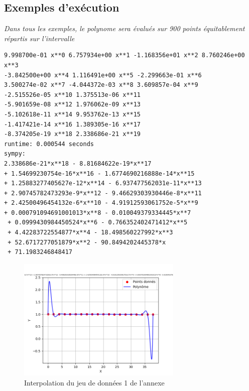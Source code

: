 \subsection{Exemples d'exécution}
\textit{Dans tous les exemples, le polynome sera évalués sur 900 points équitablement répartis sur l'intervalle}
\begin{lstlisting}[caption=res41.err, basicstyle=\fontsize{8}{10}\selectfont]
9.998700e-01 x**0 6.757934e+00 x**1 -1.168356e+01 x**2 8.760246e+00 x**3
-3.842500e+00 x**4 1.116491e+00 x**5 -2.299663e-01 x**6 
3.500274e-02 x**7 -4.044372e-03 x**8 3.609857e-04 x**9 
-2.515526e-05 x**10 1.375513e-06 x**11 
-5.901659e-08 x**12 1.976062e-09 x**13 
-5.102618e-11 x**14 9.953762e-13 x**15 
-1.417421e-14 x**16 1.389305e-16 x**17 
-8.374205e-19 x**18 2.338686e-21 x**19 
runtime: 0.000544 seconds
sympy: 
2.338686e-21*x**18 - 8.81684622e-19*x**17 
+ 1.54699230754e-16*x**16 - 1.6774690216888e-14*x**15 
+ 1.25883277405627e-12*x**14 - 6.937477562031e-11*x**13 
+ 2.90745782473293e-9*x**12 - 9.46629303930446e-8*x**11 
+ 2.42500496454132e-6*x**10 - 4.91912593061752e-5*x**9 
+ 0.000791094691001013*x**8 - 0.010049379334445*x**7
 + 0.0999430984450524*x**6 - 0.766352402471412*x**5 
 + 4.42283722554877*x**4 - 18.498560227992*x**3 
 + 52.6717277051879*x**2 - 90.8494202445378*x 
 + 71.1983246848417
\end{lstlisting}
\begin{figure}[h]
    \centering
    \includegraphics[width=0.7\textwidth]{sources/max/res41.-fig.png}
    \caption{Interpolation du jeu de données 1 de l'annexe}
\end{figure}
\newpage
